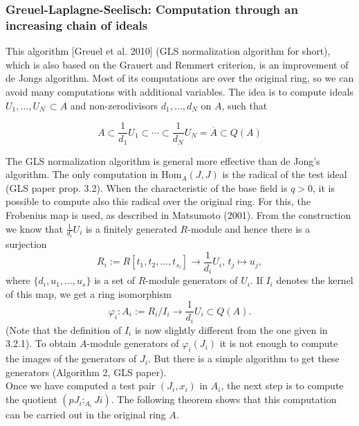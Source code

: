 \documentclass{article}
\begin{document}
\subsubsection{Greuel-Laplagne-Seelisch: Computation through an increasing chain of ideals}
{This algorithm [Greuel et al. 2010] (GLS normalization algorithm for short),
which is also based on the Grauert and Remmert criterion, is an improvement of
de Jongs algorithm. Most of its computations are over the original ring, so
we can avoid many computations with additional variables.
The idea is to compute ideals $U_1,\ldots,U_N\,\subset A$ and non-zerodivisors 
$d_1,\ldots,d_N$ on $A$, such that

$$A\subset\frac{1}{d_1}U_1\subset\cdots\subset\frac{1}{d_N}U_N=\overline{A}\subset Q(A)$$

\noindent
The GLS normalization algorithm is general more effective than de Jong's algorithm. 
The only computation in $\text{Hom}_A(J,J)$ is the radical of the test ideal
(GLS paper prop. 3.2).
When the characteristic of the base field is $q > 0$, it is possible to
compute also this radical over the original ring. For this, the Frobenius map is used, as
described in Matsumoto (2001).
From the construction we know that ${\frac{1}{d_i}} U_i$ is a finitely generated 
$R$-module and hence there is a surjection
$$R_i := R[t_1,t_2,\ldots,t_{s_i}]\rightarrow {\frac{1}{d_i}} U_i,\, t_j \mapsto u_j,$$
where $\{d_i, u_1,\ldots,u_s\}$ is a set of $R$-module generators of $U_i$. 
If $I_i$ denotes the kernel of this map, we get a ring isomorphism
$$\varphi_i : A_i := R_i/I_i \rightarrow {\frac{1}{d_i}} U_i \subset Q(A).$$
(Note that the definition of $I_i$ is now slightly different from the one given in 3.2.1).
To obtain $A$-module generators of $\varphi_i(J_i)$ it is not enough to
compute the images of the generators of $J_i$. But there is a simple algorithm 
to get these generators (Algorithm 2, GLS paper).\\
Once we have computed a test pair $(J_i,x_i)$ in $A_i$, the next step is to compute 
the quotient $(pJ_i :_{A_i} Ji)$. The following theorem shows that this 
computation can be carried out in the original ring $A$.

}
\end{document}
